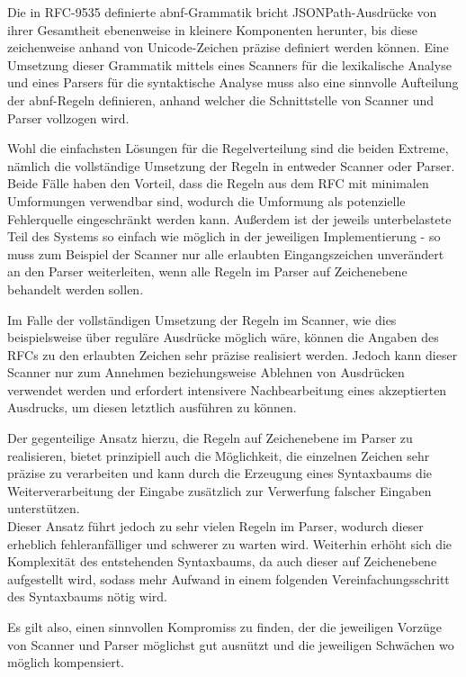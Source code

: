 \documentclass[oneside]{ausarbeitung}
\begin{document}
Die in RFC-9535 definierte \ac{abnf}-Grammatik bricht JSONPath-Ausdrücke von ihrer Gesamtheit ebenenweise in kleinere Komponenten herunter, bis diese zeichenweise anhand von Unicode-Zeichen präzise definiert werden können. Eine Umsetzung dieser Grammatik mittels eines Scanners für die lexikalische Analyse und eines Parsers für die syntaktische Analyse muss also eine sinnvolle Aufteilung der \ac{abnf}-Regeln definieren, anhand welcher die Schnittstelle von Scanner und Parser vollzogen wird.
	
Wohl die einfachsten Lösungen für die Regelverteilung sind die beiden Extreme, nämlich die vollständige Umsetzung der Regeln in entweder Scanner oder Parser. \\
Beide Fälle haben den Vorteil, dass die Regeln aus dem RFC mit minimalen Umformungen verwendbar sind, wodurch die Umformung als potenzielle Fehlerquelle eingeschränkt werden kann. Außerdem ist der jeweils unterbelastete Teil des Systems so einfach wie möglich in der jeweiligen Implementierung - so muss zum Beispiel der Scanner nur alle erlaubten Eingangszeichen unverändert an den Parser weiterleiten, wenn alle Regeln im Parser auf Zeichenebene behandelt werden sollen. 
	
Im Falle der vollständigen Umsetzung der Regeln im Scanner, wie dies beispielsweise über reguläre Ausdrücke möglich wäre, können die Angaben des RFCs zu den erlaubten Zeichen sehr präzise realisiert werden. Jedoch kann dieser Scanner nur zum Annehmen beziehungsweise Ablehnen von Ausdrücken verwendet werden und erfordert intensivere Nachbearbeitung eines akzeptierten Ausdrucks, um diesen letztlich ausführen zu können.
	
Der gegenteilige Ansatz hierzu, die Regeln auf Zeichenebene im Parser zu realisieren, bietet prinzipiell auch die Möglichkeit, die einzelnen Zeichen sehr präzise zu verarbeiten und kann durch die Erzeugung eines Syntaxbaums die Weiterverarbeitung der Eingabe zusätzlich zur Verwerfung falscher Eingaben unterstützen. \\
Dieser Ansatz führt jedoch zu sehr vielen Regeln im Parser, wodurch dieser erheblich fehleranfälliger und schwerer zu warten wird. Weiterhin erhöht sich die Komplexität des entstehenden Syntaxbaums, da auch dieser auf Zeichenebene aufgestellt wird, sodass mehr Aufwand in einem folgenden Vereinfachungsschritt des Syntaxbaums nötig wird.
	
Es gilt also, einen sinnvollen Kompromiss zu finden, der die jeweiligen Vorzüge von Scanner und Parser möglichst gut ausnützt und die jeweiligen Schwächen wo möglich kompensiert. 
\end{document}
